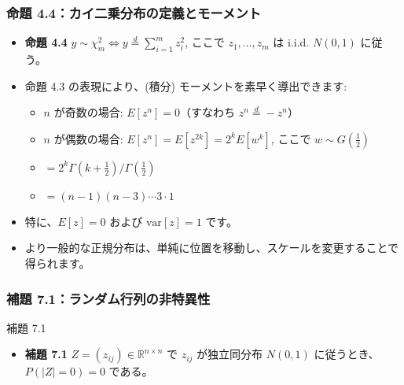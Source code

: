 \documentclass{beamer}
\begin{document}
\begin{frame}
\frametitle{命題 4.4：カイ二乗分布の定義とモーメント}
\begin{itemize}
    \item \textbf{命題 4.4} $y \sim \chi^2_m \iff y \overset{d}{=} \sum_{i=1}^{m} z_i^2$, ここで $z_1,...,z_m$ は i.i.d. $N(0, 1)$ に従う。
    \item 命題 4.3 の表現により、(積分) モーメントを素早く導出できます:
    \begin{itemize}
        \item $n$ が奇数の場合: $E[z^n] = 0$（すなわち $z^n \overset{d}{=} -z^n$）
        \item $n$ が偶数の場合: $E[z^n] = E[z^{2k}] = 2^k E[w^k]$, ここで $w \sim G(\frac{1}{2})$
        \item $= 2^k \Gamma(k + \frac{1}{2})/\Gamma(\frac{1}{2})$
        \item $= (n - 1)(n - 3)\cdots 3 \cdot 1$
    \end{itemize}
    \item 特に、$E[z] = 0$ および $\mathrm{var}[z] = 1$ です。
    \item より一般的な正規分布は、単純に位置を移動し、スケールを変更することで得られます。
\end{itemize}
\end{frame}

\begin{frame}
\frametitle{補題 7.1：ランダム行列の非特異性}
\begin{block}{補題 7.1} 
    \begin{itemize}
        \item \textbf{補題 7.1} $Z=(z_{ij})\in\mathbb{R}^{n\times n}$ で $z_{ij}$ が独立同分布 $N(0,1)$ に従うとき、$P(|Z|=0)=0$ である。
    \end{itemize}
\end{block}
\end{frame}
\end{document}
